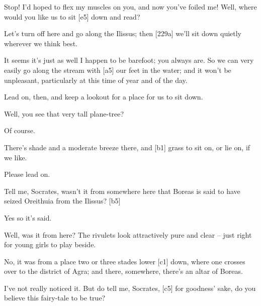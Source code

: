  Stop! I'd hoped to flex my muscles on you, and now you've
foiled me! Well, where
would you like us to sit {[}e5{]} down and read?

 Let's turn off here and go along the
Ilissus; then {[}229a{]}
we'll sit down quietly wherever we think best.

 It seems it's just as well I happen to be barefoot; you always
are. So we can very easily go along the stream with {[}a5{]} our feet in
the water; and it won't be unpleasant, particularly at this time of year
and of the day.

 Lead on, then, and keep a lookout for a place for us to sit
down.

 Well, you see that very tall plane-tree?

 Of course.

 There's shade and a moderate breeze there, and {[}b1{]} grass
to sit on, or lie on, if we like.

 Please lead on.

 Tell me, Socrates, wasn't it from somewhere here that Boreas is
said to have seized
Oreithuia from the
Ilissus? {[}b5{]}

 Yes so it's said.

 Well, was it from here? The rivulets look attractively pure and
clear -- just right for young girls to play beside.

 No, it was from a place two or three stades lower {[}c1{]}
down, where one crosses over to the district of
Agra; and there,
somewhere, there's an altar of Boreas.

 I've not really noticed it. But do tell me, Socrates, {[}c5{]}
for goodness' sake, do
you believe this fairy-tale to be true?

